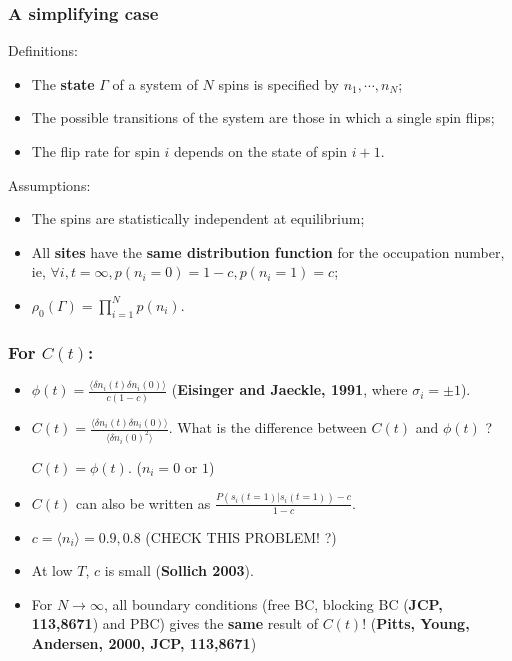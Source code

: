 \documentclass[8pt]{beamer}
\begin{document}
\begin{frame}
	\frametitle{A simplifying case}
	Definitions:
	\begin{itemize}
		\item The \textbf{state} $\Gamma$ of a system of $N$ spins is specified by $n_1 ,\cdots,n_N$;
		\item The possible transitions of the system are those in which
		a single spin flips; 
		\item The flip rate for spin $i$ depends on the state of  spin $i+1$.
	\end{itemize}	
	Assumptions:
	\begin{itemize}
		\item The spins are statistically independent at equilibrium;
		\item  All \textbf{sites} have the \textbf{same distribution function} for the occupation number, ie, $\forall i,  t=\infty,  p(n_i=0)= 1-c, p(n_i =1) = c$;
		\item $\rho_0(\Gamma) = \prod_{i=1}^N p(n_i)$.
	\end{itemize}	
\end{frame}

\begin{frame}
	\frametitle{For $C(t)$:}
	\begin{itemize}
		\item $\phi(t) = \frac{\langle \delta n_i(t) \delta n_i(0)\rangle}{c(1-c)}$ (\textbf{Eisinger and Jaeckle, 1991}, where $\sigma_i =\pm 1$).
		\item   $C(t) = \frac{\langle\delta n_i(t)\delta n_i (0)\rangle}{\langle \delta n_i(0)^2 \rangle}$. What is the difference between $C(t)$ and $\phi(t)$ ?  
		
	    $C(t)=\phi(t)$. ($n_i = 0 \text{ or } 1$)
		\item $C(t)$ can also be written as $\frac{P(s_i(t=1)| s_i(t=1))-c}{1-c}$.
		
		\item $c=\langle n_i \rangle =0.9, 0.8$ (CHECK THIS PROBLEM! ?)
		\item At low $T$, $c$ is small (\textbf{Sollich 2003}).
		\item For $N\to \infty$, all boundary conditions (free BC, blocking BC (\textbf{JCP, 113,8671}) and PBC) gives the \textbf{same} result of $C(t)$! (\textbf{Pitts, Young, Andersen, 2000, JCP, 113,8671})  
	\end{itemize}	
\end{frame}
\end{document}
